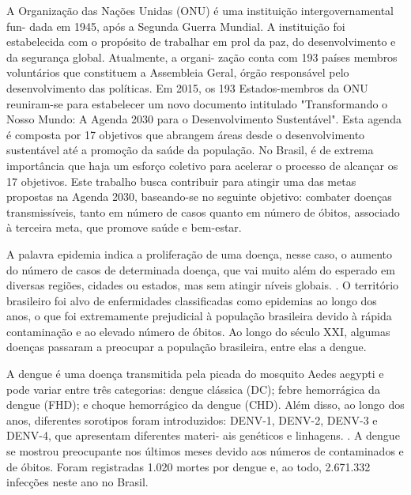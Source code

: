 A Organização das Nações Unidas (ONU) é uma instituição intergovernamental fun- dada em 1945, após a Segunda Guerra Mundial. A instituição foi estabelecida com o propósito de trabalhar em prol da paz, do desenvolvimento e da segurança global. Atualmente, a organi- zação conta com 193 países membros voluntários que constituem a Assembleia Geral, órgão responsável pelo desenvolvimento das políticas. Em 2015, os 193 Estados-membros da ONU reuniram-se para estabelecer um novo documento intitulado "Transformando o Nosso Mundo: A Agenda 2030 para o Desenvolvimento Sustentável". Esta agenda é composta por 17 objetivos que abrangem áreas desde o desenvolvimento sustentável até a promoção da saúde da população. No Brasil, é de extrema importância que haja um esforço coletivo para acelerar o processo de alcançar os 17 objetivos. Este trabalho busca contribuir para atingir uma das metas propostas na Agenda 2030, baseando-se no seguinte objetivo: combater doenças transmissíveis, tanto em número de casos quanto em número de óbitos, associado à terceira meta, que promove saúde e bem-estar. \cite{1} 

A palavra epidemia indica a proliferação de uma doença, nesse caso, o aumento do número de casos de determinada doença, que vai muito além do esperado em diversas regiões, cidades ou estados, mas sem atingir níveis globais. \cite{2}. O território brasileiro foi alvo de enfermidades classificadas como epidemias ao longo dos anos, o que foi extremamente prejudicial à população brasileira devido à rápida contaminação e ao elevado número de óbitos. Ao longo do século XXI, algumas doenças passaram a preocupar a população brasileira, entre elas a dengue.

A dengue é uma doença transmitida pela picada do mosquito Aedes aegypti e pode variar entre três categorias: dengue clássica (DC); febre hemorrágica da dengue (FHD); e choque hemorrágico da dengue (CHD). Além disso, ao longo dos anos, diferentes sorotipos foram introduzidos: DENV-1, DENV-2, DENV-3 e DENV-4, que apresentam diferentes materi- ais genéticos e linhagens. \cite{3}. A dengue se mostrou preocupante nos últimos meses devido aos números de contaminados e de óbitos. Foram registradas 1.020 mortes por dengue e, ao todo, 2.671.332 infecções neste ano no Brasil. \cite{4}

